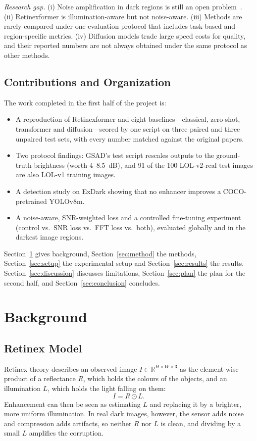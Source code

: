 \documentclass[journal]{IEEEtran}
\begin{document}
\emph{Research gap.} (i) Noise amplification in dark regions is still an open problem~\cite{li2022survey}.
(ii) Retinexformer is illumination-aware but not noise-aware. (iii) Methods are rarely compared under one evaluation
protocol that includes task-based and region-specific metrics. (iv) Diffusion models trade large speed costs for
quality, and their reported numbers are not always obtained under the same protocol as other methods.

\subsection{Contributions and Organization}
The work completed in the first half of the project is:
\begin{itemize}
\item A reproduction of Retinexformer and eight baselines---classical, zero-shot, transformer and diffusion---scored by
one script on three paired and three unpaired test sets, with every number matched against the original papers.
\item Two protocol findings: GSAD's test script rescales outputs to the ground-truth brightness (worth 4--8.5~dB), and
91 of the 100 LOL-v2-real test images are also LOL-v1 training images.
\item A detection study on ExDark showing that no enhancer improves a COCO-pretrained YOLOv8m.
\item A noise-aware, SNR-weighted loss and a controlled fine-tuning experiment (control vs.\ SNR loss vs.\ FFT loss vs.\
both), evaluated globally and in the darkest image regions.
\end{itemize}
Section~\ref{sec:background} gives background, Section~\ref{sec:method} the methods, Section~\ref{sec:setup} the
experimental setup and Section~\ref{sec:results} the results. Section~\ref{sec:discussion} discusses limitations,
Section~\ref{sec:plan} the plan for the second half, and Section~\ref{sec:conclusion} concludes.

\section{Background}\label{sec:background}
\subsection{Retinex Model}
Retinex theory describes an observed image $I\in\mathbb{R}^{H\times W\times 3}$ as the element-wise product of a
reflectance $R$, which holds the colours of the objects, and an illumination $L$, which holds the light falling on
them:
\begin{equation}
I = R \odot L. \label{eq:retinex}
\end{equation}
Enhancement can then be seen as estimating $L$ and replacing it by a brighter, more uniform illumination. In real
dark images, however, the sensor adds noise and compression adds artifacts, so neither $R$ nor $L$ is clean, and
dividing by a small $L$ amplifies the corruption.
\end{document}

